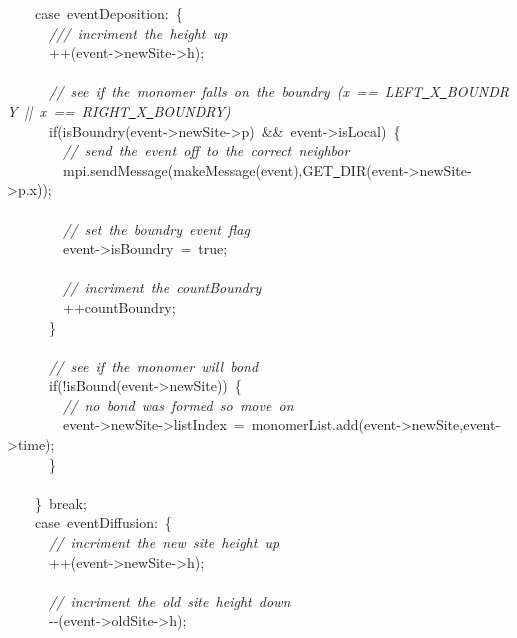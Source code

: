 {\ \ \ \ case\ eventDeposition:\ \{\\
\ \ \ \ \ \ \textsl{///\ incriment\ the\ height\ up}\\
\ \ \ \ \ \ ++(event-{}>{}newSite-{}>{}h);\\
\ \\
\ \ \ \ \ \ \textsl{//\ see\ if\ the\ monomer\ falls\ on\ the\ boundry\ (x\ ==\ LEFT\underline\ X\underline\ BOUNDRY\ ||\ x\ ==\ RIGHT\underline\ X\underline\ BOUNDRY)}\\
\ \ \ \ \ \ if(isBoundry(event-{}>{}newSite-{}>{}p)\ \&\&\ event-{}>{}isLocal)\ \{\\
\ \ \ \ \ \ \ \ \textsl{//\ send\ the\ event\ off\ to\ the\ correct\ neighbor}\\
\ \ \ \ \ \ \ \ mpi.sendMessage(makeMessage(event),GET\underline\ DIR(event-{}>{}newSite-{}>{}p.x));\\
\ \\
\ \ \ \ \ \ \ \ \textsl{//\ set\ the\ boundry\ event\ flag}\\
\ \ \ \ \ \ \ \ event-{}>{}isBoundry\ =\ true;\\
\ \\
\ \ \ \ \ \ \ \ \textsl{//\ incriment\ the\ countBoundry}\\
\ \ \ \ \ \ \ \ ++countBoundry;\\
\ \ \ \ \ \ \}\\
\ \\
\ \ \ \ \ \ \textsl{//\ see\ if\ the\ monomer\ will\ bond}\\
\ \ \ \ \ \ if(!isBound(event-{}>{}newSite))\ \{\\
\ \ \ \ \ \ \ \ \textsl{//\ no\ bond\ was\ formed\ so\ move\ on}\\
\ \ \ \ \ \ \ \ event-{}>{}newSite-{}>{}listIndex\ =\ monomerList.add(event-{}>{}newSite,event-{}>{}time);\\
\ \ \ \ \ \ \}\\
\ \\
\ \ \ \ \}\ break;\\
\ \ \ \ case\ eventDiffusion:\ \{\\
\ \ \ \ \ \ \textsl{//\ incriment\ the\ new\ site\ height\ up}\\
\ \ \ \ \ \ ++(event-{}>{}newSite-{}>{}h);\\
\ \\
\ \ \ \ \ \ \textsl{//\ incriment\ the\ old\ site\ height\ down}\\
\ \ \ \ \ \ -{}-{}(event-{}>{}oldSite-{}>{}h);\\
\ \\
}
